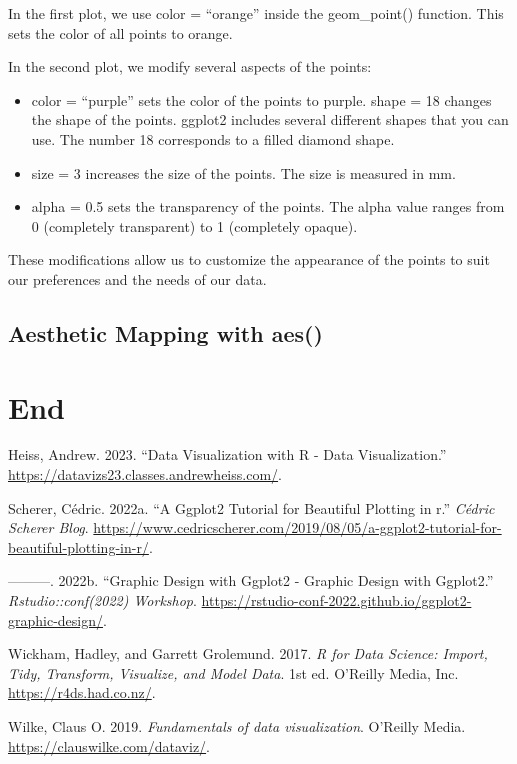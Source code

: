 \documentclass[
  letterpaper,
  DIV=11,
  numbers=noendperiod]{scrartcl}
\providecommand{\tightlist}{%
  \setlength{\itemsep}{0pt}\setlength{\parskip}{0pt}}\usepackage{longtable,booktabs,array}
\newlength{\cslhangindent}
\newlength{\cslentryspacingunit} %
\newenvironment{CSLReferences}[2] %
 {%
  \setlength{\parindent}{0pt}
  \ifodd #1
  \let\oldpar\par
  \def\par{\hangindent=\cslhangindent\oldpar}
  \fi
  \setlength{\parskip}{#2\cslentryspacingunit}
 }%
 {}
\begin{document}
In the first plot, we use color = ``orange'' inside the geom\_point()
function. This sets the color of all points to orange.

In the second plot, we modify several aspects of the points:

\begin{itemize}
\tightlist
\item
  color = ``purple'' sets the color of the points to purple. shape = 18
  changes the shape of the points. ggplot2 includes several different
  shapes that you can use. The number 18 corresponds to a filled diamond
  shape.
\item
  size = 3 increases the size of the points. The size is measured in mm.
\item
  alpha = 0.5 sets the transparency of the points. The alpha value
  ranges from 0 (completely transparent) to 1 (completely opaque).
\end{itemize}

These modifications allow us to customize the appearance of the points
to suit our preferences and the needs of our data.

\hypertarget{aesthetic-mapping-with-aes}{%
\subsection{Aesthetic Mapping with
aes()}\label{aesthetic-mapping-with-aes}}

\hypertarget{end}{%
\section*{End}\label{end}}

\hypertarget{refs}{}
\begin{CSLReferences}{1}{0}
\leavevmode{}%
Heiss, Andrew. 2023. {``{D}ata {V}isualization with {R} - {D}ata
{V}isualization.''} \url{https://datavizs23.classes.andrewheiss.com/}.

\leavevmode{}%
Scherer, Cédric. 2022a. {``A Ggplot2 Tutorial for Beautiful Plotting in
r.''} \emph{Cédric Scherer Blog}.
\url{https://www.cedricscherer.com/2019/08/05/a-ggplot2-tutorial-for-beautiful-plotting-in-r/}.

\leavevmode{}%
---------. 2022b. {``{G}raphic {D}esign with Ggplot2 - {G}raphic
{D}esign with Ggplot2.''} \emph{Rstudio::conf(2022) Workshop}.
\url{https://rstudio-conf-2022.github.io/ggplot2-graphic-design/}.

\leavevmode{}%
Wickham, Hadley, and Garrett Grolemund. 2017. \emph{R for Data Science:
Import, Tidy, Transform, Visualize, and Model Data}. 1st ed. O'Reilly
Media, Inc. \url{https://r4ds.had.co.nz/}.

\leavevmode{}%
Wilke, Claus O. 2019. \emph{{Fundamentals of data visualization}}.
{O'Reilly Media}. \url{https://clauswilke.com/dataviz/}.

\end{CSLReferences}
\end{document}
